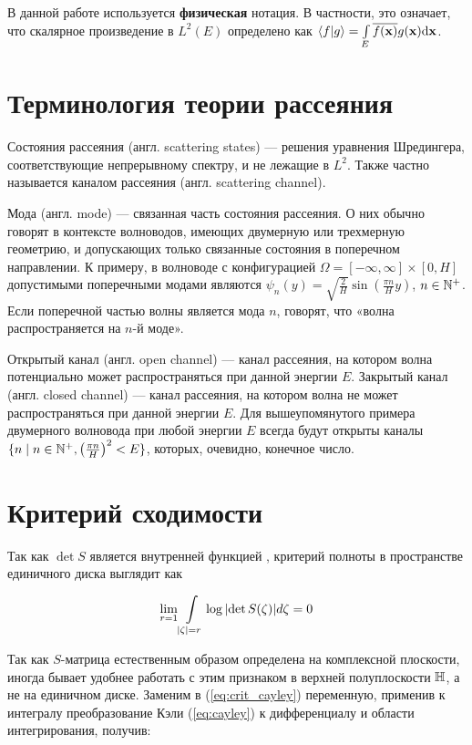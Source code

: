 В данной работе используется \textbf{физическая} нотация. В частности, это означает, что скалярное произведение в $L^2(E)$ определено как $\ip{f}{g} = \int\limits_E \cconj{f(\vb{x})} g(\vb{x}) \dd \vb{x}$.

\section{Терминология теории рассеяния}
Состояния рассеяния (англ. scattering states) — решения уравнения Шредингера, соответствующие непрерывному спектру, и не лежащие в $L^2$. Также частно называется каналом рассеяния (англ. scattering channel).

Мода (англ. mode) — связанная часть состояния рассеяния. О них обычно говорят в контексте волноводов, имеющих двумерную или трехмерную геометрию, и допускающих только связанные состояния в поперечном направлении. К примеру, в волноводе с конфигурацией $\Omega = [-\infty, \infty] \times [0, H]$ допустимыми поперечными модами являются $\psi_n(y) = \sqrt{\frac{2}{H}} \sin(\frac{\pi n}{H} y)$, $n \in \mathbb{N}^+$. Если поперечной частью волны является мода $n$, говорят, что «волна распространяется на $n$-й моде».

Открытый канал (англ. open channel) — канал рассеяния, на котором волна потенциально может распространяться при данной энергии $E$. Закрытый канал (англ. closed channel) — канал рассеяния, на котором волна не может распространяться при данной энергии $E$. Для вышеупомянутого примера двумерного волновода при любой энергии $E$ всегда будут открыты каналы $\{n \mid n \in \mathbb{N}^+, \left(\frac{\pi n}{H}\right)^2 < E \}$, которых, очевидно, конечное число.

\section{Критерий сходимости}

Так как $\det S$ является внутренней функцией ,  критерий полноты в пространстве единичного диска выглядит как

\begin{equation}\label{eq:crit_cayley}
\lim\limits_{r = 1} \int\limits_{\abs{\zeta} = r} \log \abs{\det S(\zeta)} d \zeta = 0
\end{equation}

Так как $S$-матрица естественным образом определена на комплексной плоскости, иногда бывает удобнее работать с этим признаком в верхней полуплоскости $\mathbb{H}$, а не на единичном диске. Заменим в (\ref{eq:crit_cayley}) переменную, применив к интегралу преобразование Кэли (\ref{eq:cayley}) к дифференциалу и области интегрирования, получив:

